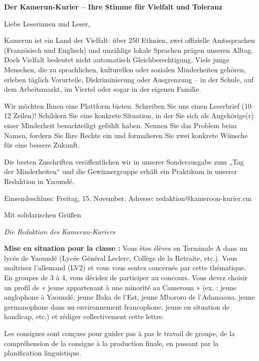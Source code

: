 \documentclass[11pt]{article}
\newcounter{popsec}
\newcounter{popsub}
\newcommand{\courssub}[1]{%
  \stepcounter{popsub}%
  \par\vspace{9pt}\noindent{\popxbold\fontsize{11.5}{13}\selectfont\color{popink}{\color{poporange}\thepopsec.\thepopsub}\hspace{6pt}#1}\par\nopagebreak\vspace{4pt}
}
\begin{document}
\courssub{Situation}
\begin{textebox}
\large \textbf{Der Kamerun-Kurier – Ihre Stimme für Vielfalt und Toleranz}

\medskip
\noindent
Liebe Leserinnen und Leser,

Kamerun ist ein Land der Vielfalt: über 250 Ethnien, zwei offizielle Amtssprachen (Französisch und Englisch) und unzählige lokale Sprachen prägen unseren Alltag. Doch Vielfalt bedeutet nicht automatisch Gleichberechtigung. Viele junge Menschen, die zu sprachlichen, kulturellen oder sozialen Minderheiten gehören, erleben täglich Vorurteile, Diskriminierung oder Ausgrenzung – in der Schule, auf dem Arbeitsmarkt, im Viertel oder sogar in der eigenen Familie.

Wir möchten Ihnen eine Plattform bieten. Schreiben Sie uns einen Leserbrief (10--12 Zeilen)! Schildern Sie eine konkrete Situation, in der Sie sich als Angehörige(r) einer Minderheit benachteiligt gefühlt haben. Nennen Sie das Problem beim Namen, fordern Sie Ihre Rechte ein und formulieren Sie zwei konkrete Wünsche für eine bessere Zukunft.

Die besten Zuschriften veröffentlichen wir in unserer Sonderausgabe zum „Tag der Minderheiten“ und die Gewinnergruppe erhält ein Praktikum in unserer Redaktion in Yaoundé.

Einsendeschluss: Freitag, 15. November. Adresse: redaktion@kameroon-kurier.cm

Mit solidarischen Grüßen

\emph{Die Redaktion des Kamerun-Kuriers}
\end{textebox}

\noindent
\textbf{Mise en situation pour la classe :} Vous êtes élèves en Terminale A dans un lycée de Yaoundé (Lycée Général Leclerc, Collège de la Retraite, etc.). Vous maîtrisez l'allemand (LV2) et vous vous sentez concernés par cette thématique. En groupes de 3 à 4, vous décidez de participer au concours. Vous devez choisir un profil de « jeune appartenant à une minorité au Cameroun » (ex. : jeune anglophone à Yaoundé, jeune Baka de l'Est, jeune Mbororo de l'Adamaoua, jeune germanophone dans un environnement francophone, jeune en situation de handicap, etc.) et rédiger collectivement cette lettre.

\courssub{Consignes}
Les consignes sont conçues pour guider pas à pas le travail de groupe, de la compréhension de la consigne à la production finale, en passant par la planification linguistique.
\end{document}
